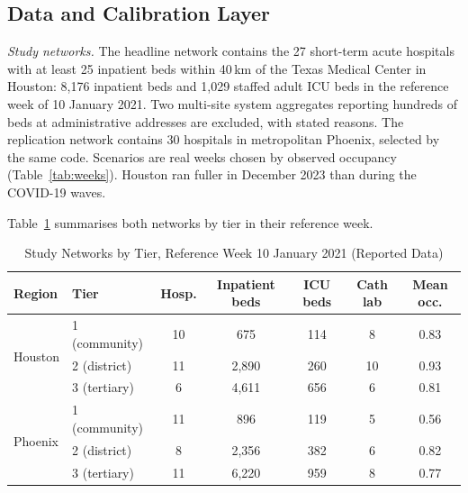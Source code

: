 \subsection{Data and Calibration Layer}
\label{sec:data}
\emph{Study networks.} The headline network contains the 27 short-term acute hospitals with at least 25 inpatient beds within 40\,km of the Texas Medical Center in Houston: 8,176 inpatient beds and 1,029 staffed adult ICU beds in the reference week of 10 January 2021. Two multi-site system aggregates reporting hundreds of beds at administrative addresses are excluded, with stated reasons. The replication network contains 30 hospitals in metropolitan Phoenix, selected by the same code. Scenarios are real weeks chosen by observed occupancy (Table~\ref{tab:weeks}). Houston ran fuller in December 2023 than during the COVID-19 waves.

Table~\ref{tab:networks} summarises both networks by tier in their reference week.

\begin{table}[!t]
\centering
\caption{Study Networks by Tier, Reference Week 10 January 2021 (Reported Data)}
\label{tab:networks}
\scriptsize
\setlength{\tabcolsep}{2.2pt}
\begin{tabular}{@{}llccccc@{}}
\toprule
Region & Tier & Hosp. & Inpatient beds & ICU beds & Cath lab & Mean occ. \\
\midrule
\multirow{3}{*}{Houston} & 1 (community) & 10 & 675 & 114 & 8 & 0.83 \\
 & 2 (district) & 11 & 2,890 & 260 & 10 & 0.93 \\
 & 3 (tertiary) & 6 & 4,611 & 656 & 6 & 0.81 \\
\midrule
\multirow{3}{*}{Phoenix} & 1 (community) & 11 & 896 & 119 & 5 & 0.56 \\
 & 2 (district) & 8 & 2,356 & 382 & 6 & 0.82 \\
 & 3 (tertiary) & 11 & 6,220 & 959 & 8 & 0.77 \\
\bottomrule
\end{tabular}
\end{table}

